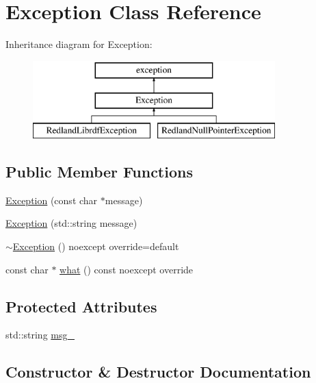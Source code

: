 \hypertarget{classException}{}\section{Exception Class Reference}
\label{classException}
Inheritance diagram for Exception\+:\begin{figure}[H]
\begin{center}
\leavevmode
\includegraphics[height=3.000000cm]{classException}
\end{center}
\end{figure}
\subsection*{Public Member Functions}
\begin{DoxyCompactItemize}
\item 
\hyperlink{classException_ac541ead5c20548813d7dea73c28c7fab}{Exception} (const char $\ast$message)
\item 
\hyperlink{classException_a0b1693d4d5007815322070c907ee5cc2}{Exception} (std\+::string message)
\item 
\hyperlink{classException_ab834fdbc275748cf287b994503521ada}{$\sim$\+Exception} () noexcept override=default
\item 
const char $\ast$ \hyperlink{classException_ae7ba8334eb35e001b4b0c6df9339c0dc}{what} () const noexcept override
\end{DoxyCompactItemize}
\subsection*{Protected Attributes}
\begin{DoxyCompactItemize}
\item 
std\+::string \hyperlink{classException_a5d59cc46086c61391ed26773ce861780}{msg\+\_\+}
\end{DoxyCompactItemize}


\subsection{Constructor \& Destructor Documentation}
\mbox{\label{classException_ac541ead5c20548813d7dea73c28c7fab}} 
